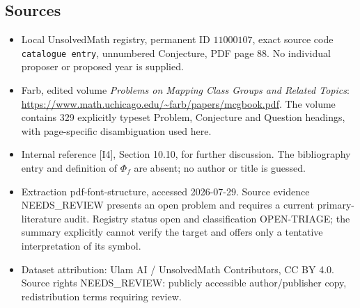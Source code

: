 \documentclass[11pt]{article}
\begin{document}
\subsection{Sources}
\begin{itemize}
\item Local UnsolvedMath registry, permanent ID \(11000107\), exact source code \texttt{catalogue entry}, unnumbered Conjecture, PDF page 88. No individual proposer or proposed year is supplied.
\item Farb, edited volume \emph{Problems on Mapping Class Groups and Related Topics}: \url{https://www.math.uchicago.edu/~farb/papers/mcgbook.pdf}. The volume contains 329 explicitly typeset Problem, Conjecture and Question headings, with page-specific disambiguation used here.
\item Internal reference [I4], Section 10.10, for further discussion. The bibliography entry and definition of \(\Phi_f\) are absent; no author or title is guessed.
\item Extraction pdf-font-structure, accessed 2026-07-29. Source evidence NEEDS\_REVIEW presents an open problem and requires a current primary-literature audit. Registry status open and classification OPEN-TRIAGE; the summary explicitly cannot verify the target and offers only a tentative interpretation of its symbol.
\item Dataset attribution: Ulam AI / UnsolvedMath Contributors, CC BY 4.0. Source rights NEEDS\_REVIEW: publicly accessible author/publisher copy, redistribution terms requiring review.
\end{itemize}
\end{document}
